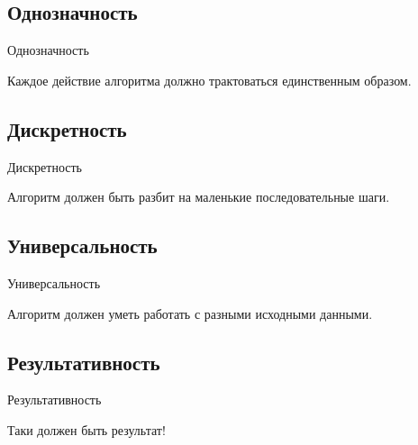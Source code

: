 \documentclass[compress,red]{beamer}
\begin{document}
\subsection{Однозначность}
\begin{frame}
  \begin{center}
    \Huge{Однозначность}
  \end{center}
  \begin{center}
    \Large{Каждое действие алгоритма должно трактоваться единственным образом.}
  \end{center}
\end{frame}

\subsection{Дискретность}
\begin{frame}
  \begin{center}
    \Huge{Дискретность}
  \end{center}
  \begin{center}
    \Large{Алгоритм должен быть разбит на маленькие последовательные шаги.}
  \end{center}
\end{frame}

\subsection{Универсальность}
\begin{frame}
  \begin{center}
    \Huge{Универсальность}
  \end{center}
  \begin{center}
    \Large{Алгоритм должен уметь работать с разными исходными данными.}
  \end{center}
\end{frame}

\subsection{Результативность}
\begin{frame}
  \begin{center}
    \Huge{Результативность}
  \end{center}
  \begin{center}
    \Large{Таки должен быть результат!}
  \end{center}
\end{frame}
\end{document}
